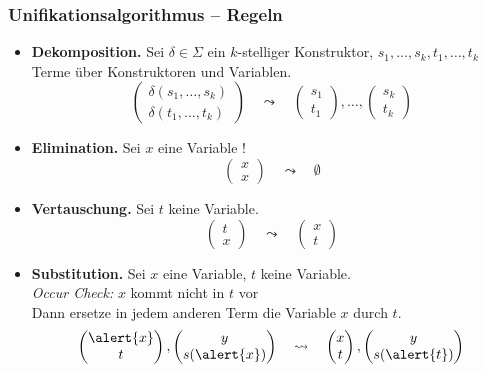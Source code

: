 \documentclass{beamer}
\begin{document}
\begin{frame}\frametitle{Unifikationsalgorithmus -- Regeln}
	\footnotesize
	\begin{itemize}
		\item \textbf{Dekomposition.} Sei $\delta \in \Sigma$ ein $k$-stelliger Konstruktor, $s_1 , \dots , s_k , t_1 , \dots , t_k$ Terme über Konstruktoren und Variablen.
		\begin{equation*}
			\begin{pmatrix}
				\delta(s_1, \dots , s_k) \\ \delta(t_1, \dots , t_k)
			\end{pmatrix}
			\quad \leadsto \quad
			\begin{pmatrix} s_1 \\ t_1 \end{pmatrix} , \dots , \begin{pmatrix} s_k \\ t_k \end{pmatrix}
		\end{equation*}
		\item \textbf{Elimination.} Sei $x$ eine \alert{Variable} !
		\begin{equation*}
			\begin{pmatrix} x \\ x \end{pmatrix}
			\quad \leadsto \quad
			\emptyset
		\end{equation*}
		\item \textbf{Vertauschung.} Sei $t$ \alert{keine} Variable.
		\begin{equation*}
			\begin{pmatrix} t \\ x \end{pmatrix}
			\quad \leadsto \quad 
			\begin{pmatrix} x \\ t \end{pmatrix}
		\end{equation*}
		\item \textbf{Substitution.} Sei $x$ eine Variable, $t$ keine Variable. \\
		\textit{Occur Check:} $x$ kommt nicht in $t$ vor \\
		Dann ersetze in jedem anderen Term die Variable $x$ durch $t$.
		\begin{equation*}
			\begin{pmatrix} \alert{x} \\ t \end{pmatrix},
			\begin{pmatrix} y \\ s(\alert{x}) \end{pmatrix}
			\quad \leadsto \quad 
			\begin{pmatrix} x \\ t \end{pmatrix},			\begin{pmatrix} y \\ s(\alert{t}) \end{pmatrix}
		\end{equation*}
	\end{itemize}
\end{frame}
\end{document}
